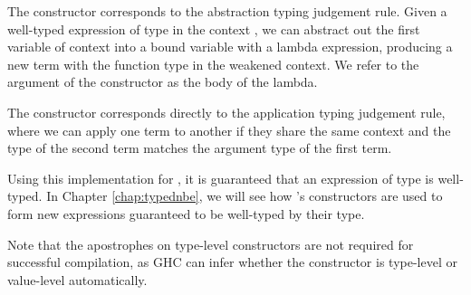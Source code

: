 
The  constructor corresponds to the abstraction typing judgement rule. Given a well-typed expression of type  in the context , we can abstract out the first variable of context into a bound variable with a lambda expression, producing a new term with the function type  in the weakened context. We refer to the argument of the  constructor as the body of the lambda.

The  constructor corresponds directly to the application typing judgement rule, where we can apply one term to another if they share the same context  and the type of the second term matches the argument type  of the first term.

Using this implementation for , it is guaranteed that an expression of type  is well-typed. In Chapter \ref{chap:typednbe}, we will see how 's constructors are used to form new expressions guaranteed to be well-typed by their type.


Note that the apostrophes on type-level constructors are not required for successful compilation, as GHC can infer whether the constructor is type-level or value-level automatically. 


